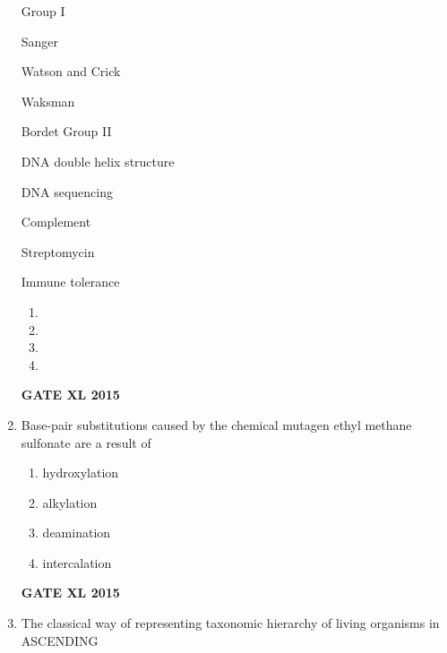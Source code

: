 \documentclass[journal,12pt,onecolumn]{IEEEtran}
\begin{document}
\begin{enumerate}
Group I

 Sanger

 Watson and Crick

 Waksman

 Bordet
Group II

 DNA double helix structure

 DNA sequencing

 Complement

 Streptomycin

 Immune tolerance
    \begin{enumerate}
            \item 
	    \item 
	    \item 
            \item 
    \end{enumerate}
\hfill{\textbf{GATE XL 2015}}
\item Base-pair substitutions caused by the chemical mutagen ethyl methane sulfonate are a result of
    \begin{enumerate}
            \item hydroxylation
	    \item alkylation
	    \item deamination
            \item intercalation
    \end{enumerate}
\hfill{\textbf{GATE XL 2015}}
\item  The classical way of representing taxonomic hierarchy of living organisms in ASCENDING


\end{enumerate}
\end{document}
